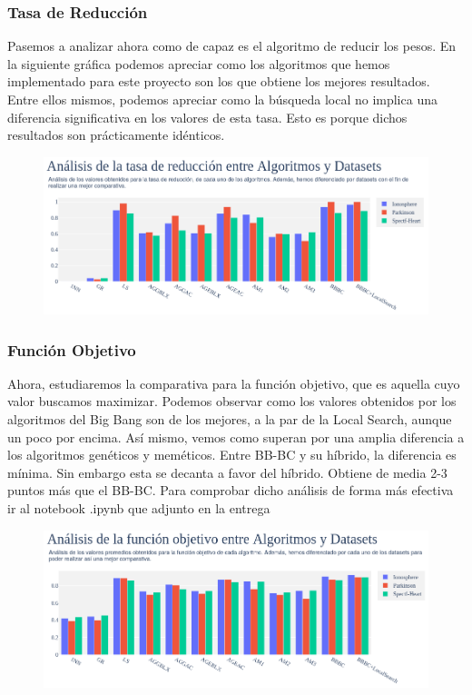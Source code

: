 \documentclass[10pt, a4paper]{article}
\theoremstyle{theorem-style}
\theoremstyle{theorem-style}
\theoremstyle{theorem2-style}
\theoremstyle{definition-style}
\theoremstyle{remark-style}
\theoremstyle{example-style}
\theoremstyle{definition-style}
\theoremstyle{remark-style}
\theoremstyle{remark-style}
\begin{document}
\newpage
\subsubsection{Tasa de Reducción}

Pasemos a analizar ahora como de capaz es el algoritmo de reducir los pesos. En la siguiente gráfica podemos apreciar como los algoritmos que hemos implementado para este proyecto son los que obtiene los mejores resultados. Entre ellos mismos, podemos apreciar como la búsqueda local no implica una diferencia significativa en los valores de esta tasa. Esto es porque dichos resultados son prácticamente idénticos. 

\begin{figure}[htp]
\centering
\includegraphics[scale=0.45]{Imagenes/reduccion.png}
\label{}
\end{figure}

\subsubsection{Función Objetivo}

Ahora, estudiaremos la comparativa para la función objetivo, que es aquella cuyo valor buscamos maximizar. Podemos observar como los valores obtenidos por los algoritmos del Big Bang son de los mejores, a la par de la Local Search, aunque un poco por encima. Así mismo, vemos como superan por una amplia diferencia a los algoritmos genéticos y meméticos. Entre BB-BC y su híbrido, la diferencia es mínima. Sin embargo esta se decanta a favor del híbrido. Obtiene de media 2-3 puntos más que el BB-BC. Para comprobar dicho análisis de forma más efectiva ir al notebook .ipynb que adjunto en la entrega

\begin{figure}[htp]
\centering
\includegraphics[scale=0.4750]{Imagenes/funcion_objetivo.png}
\label{}
\end{figure}
\end{document}
